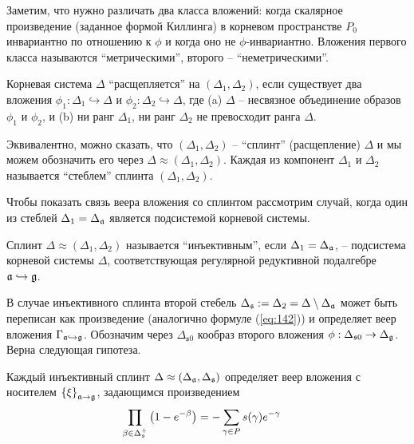 Заметим, что нужно различать два класса вложений: когда скалярное произведение (заданное формой Киллинга) в корневом пространстве $P_0$ инвариантно по отношению к  $\phi$ и когда оно не  $\phi$-инвариантно. Вложения первого класса называются ``метрическими'', второго -- ``неметрическими''. 

\begin{definition}
Корневая система $\Delta$ ``расщепляется'' на  $(\Delta _{1},\Delta _{2})$, если существует два вложения  $\phi _{1}:\Delta _{1}\hookrightarrow \Delta $ и $\phi _{2}:\Delta _{2}\hookrightarrow \Delta $, где (a) $\Delta $ -- несвязное объединение образов $\phi _{1}$ и $\phi _{2}$, и (b) ни ранг  $\Delta _{1}$, ни ранг  $\Delta _{2}$ не превосходит ранга $\Delta $.
\end{definition}

Эквивалентно, можно сказать, что  $(\Delta_1,\Delta_2)$  -- ``сплинт'' (расщепление)  $\Delta$ и мы можем обозначить его через $\Delta \approx (\Delta_1,\Delta_2)$. Каждая из компонент  $\Delta_1$ и $\Delta_2$ называется ``стеблем'' сплинта $(\Delta_1,\Delta_2)$.

Чтобы показать связь веера вложения со сплинтом рассмотрим случай, когда один из стеблей $\Delta _{1}=\Delta _{\mathfrak{a}}$  является подсистемой корневой системы. 

Сплинт $\Delta \approx (\Delta _{1},\Delta _{2})$ называется ``инъективным'', если $\Delta _{1}=\Delta _{\mathfrak{a}}$, -- подсистема корневой системы $\Delta $, соответствующая регулярной редуктивной подалгебре $\mathfrak{a}\hookrightarrow \mathfrak{g}$. 

В случае инъективного сплинта второй стебель $\Delta _{\mathfrak{s}}:=\Delta_{2}=\Delta \setminus \Delta _{\mathfrak{a}}$ может быть переписан как произведение (аналогично формуле (\ref{eq:142})) и определяет веер вложения  $\Gamma _{\mathfrak{a}\hookrightarrow \mathfrak{g}}$. Обозначим через $\Delta_{\mathfrak{s}0}$ кообраз второго вложения $\phi:\Delta_{\mathfrak{s}0}\to \Delta_{\mathfrak{g}}$. Верна следующая гипотеза.

\begin{conjecture}
Каждый инъективный сплинт $\Delta \approx (\Delta _{\mathfrak{a}},\Delta _{\mathfrak{s}})$ определяет веер вложения с носителем $\left\{ \xi \right\} _{\mathfrak{a}\rightarrow \mathfrak{g}}$, задающимся произведением
\begin{equation}
\prod_{\beta \in \Delta _{\mathfrak{s}}^{+}}\left( 1-e^{-\beta }\right)
=-\sum_{\gamma \in P}s(\gamma )e^{-\gamma }\quad   \label{splint product}
\end{equation}
\end{conjecture}

